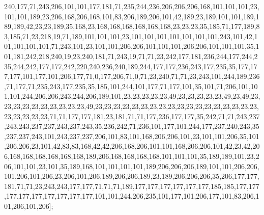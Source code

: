 240,177,71,243,206,101,101,177,181,71,235,244,236,206,206,206,168,101,101,101,23,101,101,189,23,206,168,206,168,101,83,206,189,206,101,42,189,23,189,101,101,189,189,189,42,23,23,189,35,168,23,168,168,168,168,168,168,23,23,23,35,185,71,177,189,83,185,71,23,218,19,71,189,101,101,101,23,101,101,101,101,101,101,101,243,101,42,101,101,101,101,71,243,101,23,101,101,206,206,101,101,101,206,206,101,101,101,35,101,181,242,218,240,19,23,240,181,71,243,19,71,71,23,242,177,181,236,244,177,244,235,244,242,177,177,242,220,240,236,240,189,244,177,177,236,243,177,235,35,177,177,177,101,177,101,206,177,71,0,177,206,71,0,71,23,240,71,71,23,243,101,244,189,236,71,177,71,235,243,177,235,35,185,101,244,101,177,71,177,101,35,101,71,206,101,101,101,244,206,206,243,244,206,189,101,23,23,23,23,23,49,23,23,23,23,23,49,23,49,23,23,23,23,23,23,23,23,23,23,49,23,23,23,23,23,23,23,23,23,23,23,23,23,23,23,23,23,23,23,23,23,23,23,71,71,177,177,181,23,181,71,71,177,236,177,177,35,242,71,71,243,237,243,243,237,237,243,237,243,35,236,242,71,236,101,177,101,244,177,237,240,243,35,237,237,243,101,243,237,237,206,101,83,101,168,206,206,101,23,101,101,206,35,101,206,206,23,101,42,83,83,168,42,42,206,168,206,101,101,168,206,206,101,42,23,42,206,168,168,168,168,168,168,189,206,168,168,168,168,101,101,101,35,189,189,101,23,206,101,101,23,101,35,189,168,101,101,101,101,189,206,206,206,189,101,101,206,206,101,206,101,206,23,206,101,206,189,206,206,189,23,189,206,206,206,35,206,177,177,181,71,71,23,243,243,177,177,71,71,71,189,177,177,177,177,177,177,185,185,177,177,177,177,177,177,177,177,177,101,101,244,206,235,101,177,101,206,177,101,83,206,101,206,101,206];

